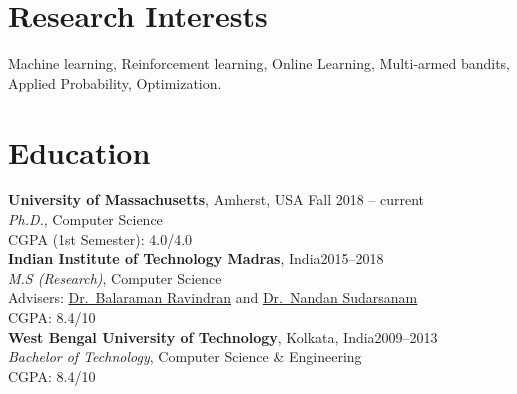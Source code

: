 \documentclass[margin,11pt]{res}
\begin{document}
\begin{resume}

\section{Research Interests}

Machine learning, Reinforcement learning, Online Learning, Multi-armed bandits, Applied Probability, Optimization.

%


\section{Education}
\textbf{University of Massachusetts}, Amherst, USA \hfill Fall 2018 -- current\\
{\sl Ph.D.}, Computer Science \\
CGPA (1st Semester): 4.0/4.0
\\[0.25cm]
\textbf{Indian Institute of Technology Madras}, India\hfill 2015--2018 \\
{\sl M.S (Research)}, Computer Science \\
Advisers: \href{https://www.cse.iitm.ac.in/~ravi/}{Dr.~Balaraman Ravindran} and \href{https://doms.iitm.ac.in/index.php/nandan-s}{Dr.~Nandan Sudarsanam}\\ CGPA: 8.4/10
\\[0.25cm]
\textbf{West Bengal University of Technology}, Kolkata, India\hfill 2009--2013\\
{\sl Bachelor of Technology}, Computer Science \& Engineering\\ CGPA: 8.4/10

\end{resume}
\end{document}
